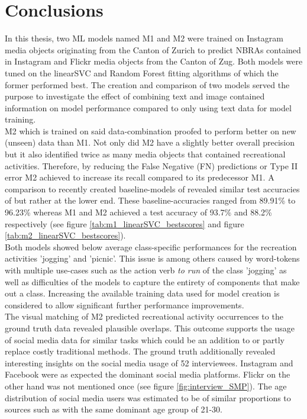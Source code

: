 \chapter{Conclusions} \label{conclusion_outlook}

In this thesis, two ML models named M1 and M2 were trained on Instagram media objects originating from the Canton of Zurich to predict NBRAs contained in Instagram and Flickr media objects from the Canton of Zug. Both models were tuned on the linearSVC and Random Forest fitting algorithms of which the former performed best. The creation and comparison of two models served the purpose to investigate the effect of combining text and image contained information on model performance compared to only using text data for model training.\\
M2 which is trained on said data-combination proofed to perform better on new (unseen) data than M1. Not only did M2 have a slightly better overall precision but it also identified twice as many media objects that contained recreational activities. Therefore, by reducing the False Negative (FN) predictions or Type II error M2 achieved to increase its recall compared to its predecessor M1. A comparison to recently created baseline-models of \parencite{Das2018, Li2018} revealed similar test accuracies of but rather at the lower end. These baseline-accuracies ranged from 89.91\% to 96.23\% whereas M1 and M2 achieved a test accuracy of 93.7\% and 88.2\% respectively (see figure \ref{tab:m1_linearSVC_bestscores} and figure \ref{tab:m2_linearSVC_bestscores}). \\

Both models showed below average class-specific performances for the recreation activities 'jogging' and 'picnic'. This issue is among others caused by word-tokens with multiple use-cases such as the action verb \textit{to run} of the class 'jogging' as well as difficulties of the models to capture the entirety of components that make
out a class. Increasing the available training data used for model creation is considered to allow significant further performance improvements.\\ 

The visual matching of M2 predicted recreational activity occurrences to the ground truth data revealed plausible overlaps. This outcome supports the usage of social media data for similar tasks which could be an addition to or partly replace costly traditional methods. The ground truth additionally revealed interesting insights on the social media usage of 52 interviewees. Instagram and Facebook were as expected the dominant social media platforms. Flickr on the other hand was not mentioned once (see figure \ref{fig:interview_SMP}). The age distribution of social media users was estimated to be of similar proportions to sources such as \parencite{2013} with the same dominant age group of 21-30.


